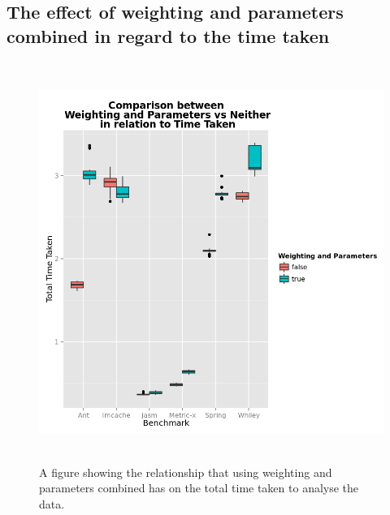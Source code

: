 \begin{appendices}
\chapter{The effect of weighting and parameters combined in regard to the time taken}
\begin{figure}[h]
\centering
\includegraphics[width=\textwidth,height=13cm]{WeightnParamTime.png}
\caption{A figure showing the relationship that using weighting and parameters combined has on the total time taken to analyse the data.}
\label{fig:weightparamtime}
\end{figure}


\end{appendices}
